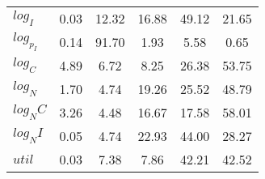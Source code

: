 \begin{center}
\begin{longtable}{lccccc}
$log_I     $	 & 	        0.03	 & 	       12.32	 & 	       16.88	 & 	       49.12	 & 	       21.65 \\ 
$log_p_I   $	 & 	        0.14	 & 	       91.70	 & 	        1.93	 & 	        5.58	 & 	        0.65 \\ 
$log_C     $	 & 	        4.89	 & 	        6.72	 & 	        8.25	 & 	       26.38	 & 	       53.75 \\ 
$log_N     $	 & 	        1.70	 & 	        4.74	 & 	       19.26	 & 	       25.52	 & 	       48.79 \\ 
$log_NC    $	 & 	        3.26	 & 	        4.48	 & 	       16.67	 & 	       17.58	 & 	       58.01 \\ 
$log_NI    $	 & 	        0.05	 & 	        4.74	 & 	       22.93	 & 	       44.00	 & 	       28.27 \\ 
$util      $	 & 	        0.03	 & 	        7.38	 & 	        7.86	 & 	       42.21	 & 	       42.52 \\ 
\end{longtable}
 \end{center}
